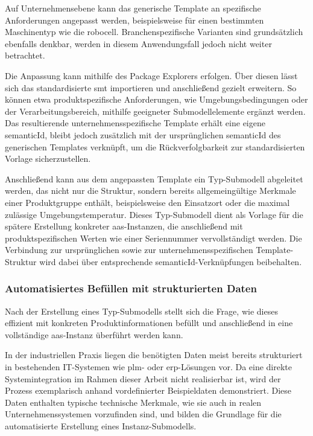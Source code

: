 Auf Unternehmensebene kann das generische Template an spezifische Anforderungen angepasst werden, beispielsweise für einen bestimmten Maschinentyp wie die robocell.
Branchenspezifische Varianten sind grundsätzlich ebenfalls denkbar, werden in diesem Anwendungsfall jedoch nicht weiter betrachtet.

Die Anpassung kann mithilfe des Package Explorers erfolgen.
Über diesen lässt sich das standardisierte \acs{smt} importieren und anschließend gezielt erweitern.
So können etwa produktspezifische Anforderungen, wie Umgebungsbedingungen oder der Verarbeitungsbereich, mithilfe geeigneter Submodellelemente ergänzt werden.
Das resultierende unternehmensspezifische Template erhält eine eigene semanticId, bleibt jedoch zusätzlich mit der ursprünglichen semanticId des generischen Templates verknüpft, um die Rückverfolgbarkeit zur standardisierten Vorlage sicherzustellen.

Anschließend kann aus dem angepassten Template ein Typ-Submodell abgeleitet werden, das nicht nur die Struktur, sondern bereits allgemeingültige Merkmale einer Produktgruppe enthält, beispielsweise den Einsatzort oder die maximal zulässige Umgebungstemperatur.
Dieses Typ-Submodell dient als Vorlage für die spätere Erstellung konkreter \acs{aas}-Instanzen, die anschließend mit produktspezifischen Werten wie einer Seriennummer vervollständigt werden.
Die Verbindung zur ursprünglichen sowie zur unternehmensspezifischen Template-Struktur wird dabei über entsprechende semanticId-Verknüpfungen beibehalten.


\subsubsection{Automatisiertes Befüllen mit strukturierten Daten}
Nach der Erstellung eines Typ-Submodells stellt sich die Frage, wie dieses effizient mit konkreten Produktinformationen befüllt und anschließend in eine vollständige \acs{aas}-Instanz überführt werden kann.

In der industriellen Praxis liegen die benötigten Daten meist bereits strukturiert in bestehenden IT-Systemen wie \acs{plm}- oder \acs{erp}-Lösungen vor.
Da eine direkte Systemintegration im Rahmen dieser Arbeit nicht realisierbar ist, wird der Prozess exemplarisch anhand vordefinierter Beispieldaten demonstriert.
Diese Daten enthalten typische technische Merkmale, wie sie auch in realen Unternehmenssystemen vorzufinden sind, und bilden die Grundlage für die automatisierte Erstellung eines Instanz-Submodells.

